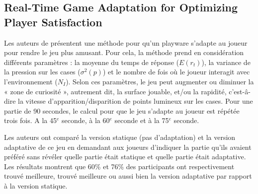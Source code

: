 \documentclass{article}
\begin{document}
    \subsection{Real-Time Game Adaptation for Optimizing Player Satisfaction}
        Les auteurs de \cite{yannakakis_et_al._2009} présentent une méthode pour qu'un playware s'adapte au joueur pour rendre le jeu plus amusant. 
        Pour cela, la méthode prend en considération différents paramètres : la moyenne du temps de réponse ($E(r_t)$), la variance de la pression sur les cases ($\sigma^2 (p)$) et le nombre de fois où le joueur interagit avec l'environnement ($N_I$). 
        Selon ces paramètres, le jeu peut augmenter ou diminuer la « zone de curiosité », autrement dit, la surface jouable, et/ou la rapidité, c’est-â-dire la vitesse d’apparition/disparition de points lumineux sur les cases. 
        Pour une partie de 90 secondes, le calcul pour que le jeu s'adapte au joueur est répétée trois fois. A la 45$^e$ seconde, à la 60$^e$ seconde et à la 75$^e$ seconde.\par
        Les auteurs ont comparé la version statique (pas d'adaptation) et la version adaptative de ce jeu en demandant aux joueurs d'indiquer la partie qu'ils avaient préféré sans révéler quelle partie était statique et quelle partie était adaptative. 
        Les résultats montrent que 60\% et 76\% des participants ont respectivement trouvé meilleure, trouvé meilleure ou aussi bien la version adaptative par rapport à la version statique.
        
    
\end{document}
